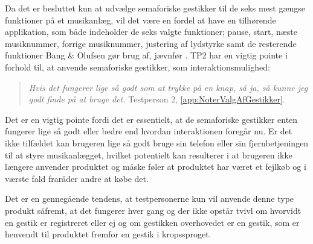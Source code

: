Da det er besluttet kun at udvælge semaforiske gestikker til de seks mest gængse funktioner på et musikanlæg, vil det være en fordel at have en tilhørende applikation, som både indeholder de seks valgte funktioner; pause, start, næste musiknummer, forrige musiknummer, justering af lydstyrke samt de resterende funktioner Bang $\&$ Olufsen gør brug af, jævnfør .\blankline
% 
TP2 har en vigtig pointe i forhold til, at anvende semaforiske gestikker, som interaktionsmulighed: 
%
\begin{quotation}
\noindent
\textit{Hvis det fungerer lige så godt som at trykke på en knap, så ja, så kunne jeg godt finde på at bruge det.} Testperson 2, \autoref{app:NoterValgAfGestikker}. 
\end{quotation}
%
Det er en vigtig pointe fordi det er essentielt, at de semaforiske gestikker enten fungerer lige så godt eller bedre end hvordan interaktionen foregår nu. Er det ikke tilfældet kan brugeren lige så godt bruge sin telefon eller sin fjernbetjeningen til at styre musikanlægget, hvilket potentielt kan resulterer i at brugeren ikke længere anvender produktet og måske føler at produktet har været et fejlkøb og i værste fald fraråder andre at købe det. 

Det er en gennegående tendens, at testpersonerne kun vil anvende denne type produkt såfremt, at det fungerer hver gang og der ikke opstår tvivl om hvorvidt en gestik er registreret eller ej og om gestikken overhovedet er en gestik, som er henvendt til produktet fremfor en gestik i kropssproget.
